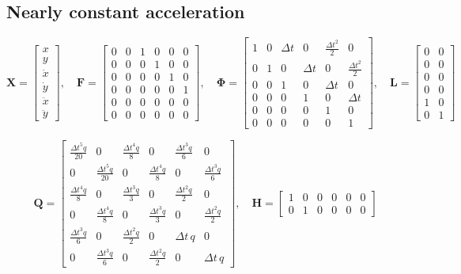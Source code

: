 \documentclass[9pt]{IEEEtran}
\begin{document}
\subsection{Nearly constant acceleration}
\[
\mathbf{X} = 
\begin{bmatrix}
x \\
y \\
\dot{x} \\
\dot{y} \\
\ddot{x} \\
\ddot{y}
\end{bmatrix}, \quad
\mathbf{F} = 
\begin{bmatrix}
0 & 0 & 1 & 0 & 0 & 0 \\
0 & 0 & 0 & 1 & 0 & 0 \\
0 & 0 & 0 & 0 & 1 & 0 \\
0 & 0 & 0 & 0 & 0 & 1 \\
0 & 0 & 0 & 0 & 0 & 0 \\
0 & 0 & 0 & 0 & 0 & 0
\end{bmatrix}, \quad
\boldsymbol{\Phi} = 
\begin{bmatrix}
1 & 0 & \Delta t & 0 & \frac{\Delta t^2}{2} & 0 \\
0 & 1 & 0 & \Delta t & 0 & \frac{\Delta t^2}{2} \\
0 & 0 & 1 & 0 & \Delta t & 0 \\
0 & 0 & 0 & 1 & 0 & \Delta t \\
0 & 0 & 0 & 0 & 1 & 0 \\
0 & 0 & 0 & 0 & 0 & 1
\end{bmatrix}, \quad
\mathbf{L} = 
\begin{bmatrix}
0 & 0 \\
0 & 0 \\
0 & 0 \\
0 & 0 \\
1 & 0 \\
0 & 1
\end{bmatrix}
\]

\[
\mathbf{Q} = 
\begin{bmatrix}
\frac{\Delta t^5 q}{20} & 0 & \frac{\Delta t^4 q}{8} & 0 & \frac{\Delta t^3 q}{6} & 0 \\
0 & \frac{\Delta t^5 q}{20} & 0 & \frac{\Delta t^4 q}{8} & 0 & \frac{\Delta t^3 q}{6} \\
\frac{\Delta t^4 q}{8} & 0 & \frac{\Delta t^3 q}{3} & 0 & \frac{\Delta t^2 q}{2} & 0 \\
0 & \frac{\Delta t^4 q}{8} & 0 & \frac{\Delta t^3 q}{3} & 0 & \frac{\Delta t^2 q}{2} \\
\frac{\Delta t^3 q}{6} & 0 & \frac{\Delta t^2 q}{2} & 0 & \Delta t\,q & 0 \\
0 & \frac{\Delta t^3 q}{6} & 0 & \frac{\Delta t^2 q}{2} & 0 & \Delta t\,q
\end{bmatrix}, \quad
\mathbf{H} = 
\begin{bmatrix}
1 & 0 & 0 & 0 & 0 & 0 \\
0 & 1 & 0 & 0 & 0 & 0
\end{bmatrix}
\]






\end{document}
